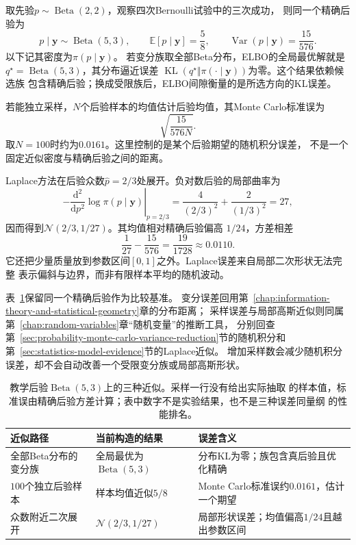 \begin{example}[同一后验上的三种近似]
  \label{ex:future-posterior-approximation-comparison}
  取先验\(p\sim\operatorname{Beta}(2,2)\)，观察四次Bernoulli试验中的三次成功，
  则同一个精确后验为
  \[
    p\mid\bm y\sim\operatorname{Beta}(5,3),
    \qquad
    \mathbb{E}[p\mid\bm y]=\frac58,
    \qquad
    \operatorname{Var}(p\mid\bm y)=\frac{15}{576}.
  \]
  以下记其密度为\(\pi(p\mid\bm y)\)。
  若变分族取全部Beta分布，ELBO的全局最优解就是
  \(q^\star=\operatorname{Beta}(5,3)\)，其分布逼近误差
  \(\operatorname{KL}(q^\star\Vert \pi(\cdot\mid\bm y))\)为零。这个结果依赖候选族
  包含精确后验；换成受限族后，ELBO间隙衡量的是所选方向的KL误差。

  若能独立采样，\(N\)个后验样本的均值估计后验均值，其Monte Carlo标准误为
  \[
    \sqrt{\frac{15}{576N}}.
  \]
  取\(N=100\)时约为\(0.0161\)。这里控制的是某个后验期望的随机积分误差，
  不是一个固定近似密度与精确后验之间的距离。

  Laplace方法在后验众数\(\widehat p=2/3\)处展开。负对数后验的局部曲率为
  \[
    -\left.
    \frac{\mathrm d^2}{\mathrm dp^2}
    \log \pi(p\mid\bm y)
    \right|_{p=2/3}
    =
    \frac{4}{(2/3)^2}+\frac{2}{(1/3)^2}
    =27,
  \]
  因而得到\(\mathcal N(2/3,1/27)\)。其均值相对精确后验偏高
  \(1/24\)，方差相差
  \[
    \frac1{27}-\frac{15}{576}
    =
    \frac{19}{1728}
    \approx0.0110.
  \]
  它还把少量质量放到参数区间\([0,1]\)之外。Laplace误差来自局部二次形状无法完整
  表示偏斜与边界，而非有限样本平均的随机波动。
\end{example}

表~\ref{tab:future-posterior-approximations}保留同一个精确后验作为比较基准。
变分误差回用第~\ref{chap:information-theory-and-statistical-geometry}章的分布距离；
采样误差与局部高斯近似则同属第~\ref{chap:random-variables}章“随机变量”的推断工具，
分别回查第~\ref{sec:probability-monte-carlo-variance-reduction}节的随机积分和
第~\ref{sec:statistics-model-evidence}节的Laplace近似。
增加采样数会减少随机积分误差，却不会自动改善一个受限变分族或局部高斯形状。

\begin{table}[htbp]
  \centering
  \begin{tabularx}{\linewidth}{lXX}
    \toprule
    近似路径 & 当前构造的结果 & 误差含义\\
    \midrule
    全部Beta分布的变分族 & 全局最优为$\operatorname{Beta}(5,3)$ & 分布KL为零；族包含真后验且优化精确\\
    $100$个独立后验样本 & 样本均值近似$5/8$ & Monte Carlo标准误约$0.0161$，估计一个期望\\
    众数附近二次展开 & $\mathcal N(2/3,1/27)$ & 局部形状误差；均值偏高$1/24$且越出参数区间\\
    \bottomrule
  \end{tabularx}
  \caption{教学后验$\operatorname{Beta}(5,3)$上的三种近似。采样一行没有给出实际抽取
  的样本值，标准误由精确后验方差计算；表中数字不是实验结果，也不是三种误差同量纲
  的性能排名。}
  \label{tab:future-posterior-approximations}
\end{table}
\FloatBarrier

